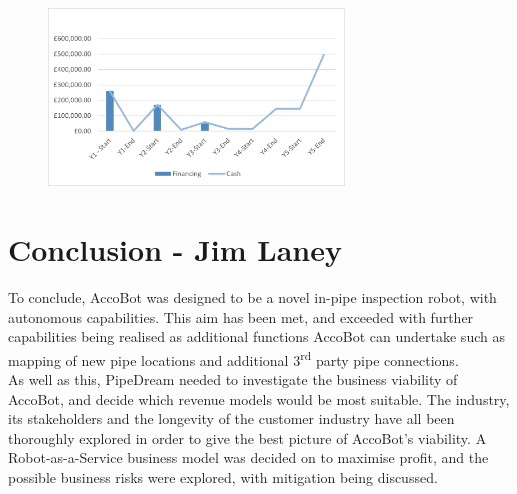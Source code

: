 \documentclass[11pt]{article}		%
\newcommand{\supercite}[1]{\textsuperscript{\cite{#1}}}		%
\begin{document}
               \begin{figure}[H]
    					\centering
        					\includegraphics[width=0.7\textwidth]{CashFlow}
        					\label{liquidity}
			    \end{figure}
			    
    \section[Conclusion]{Conclusion - Jim Laney}
        
        To conclude, AccoBot was designed to be a novel in-pipe inspection robot, with autonomous capabilities.
        This aim has been met, and exceeded with further capabilities being realised as additional functions AccoBot can undertake such as mapping of new pipe locations and additional 3\textsuperscript{rd} party pipe connections.
        \\
        As well as this, PipeDream needed to investigate the business viability of AccoBot, and decide which revenue models would be most suitable.
        The industry, its stakeholders and the longevity of the customer industry have all been thoroughly explored in order to give the best picture of AccoBot's viability.
        A Robot-as-a-Service business model was decided on to maximise profit, and the possible business risks were explored, with mitigation being discussed.

	
	
	
	
		\begingroup\onehalfspacing
			{\small
				
				
			}
		\endgroup
	
\end{document}
